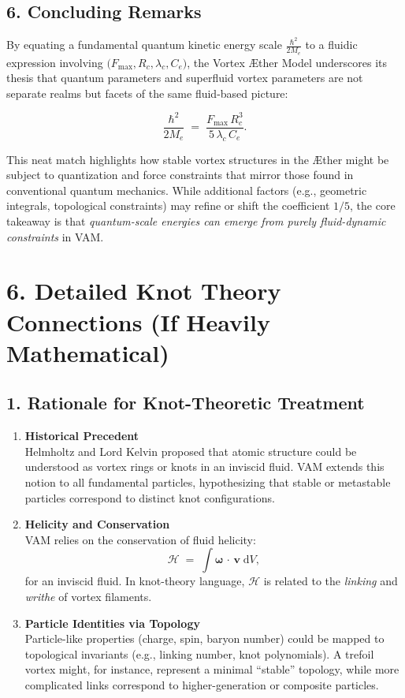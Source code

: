 \documentclass[aps,preprint,superscriptaddress]{revtex4-2}
\begin{document}
    \subsection*{6. Concluding Remarks}

    By equating a fundamental quantum kinetic energy scale \(\tfrac{\hbar^2}{2M_e}\) to a fluidic expression involving \(\bigl(F_{\max}, R_c, \lambda_c, C_e\bigr)\), the Vortex Æther Model underscores its thesis that quantum parameters and superfluid vortex parameters are not separate realms but facets of the same fluid-based picture:

    \[
        \boxed{
            \frac{\hbar^2}{2 M_e}
            \;=\;
            \frac{F_{\text{max}} \, R_c^3}{5 \,\lambda_c\,C_e}.
        }
    \]

    This neat match highlights how stable vortex structures in the Æther might be subject to quantization and force constraints that mirror those found in conventional quantum mechanics. While additional factors (e.g., geometric integrals, topological constraints) may refine or shift the coefficient \(1/5\), the core takeaway is that \textit{quantum-scale energies can emerge from purely fluid-dynamic constraints} in VAM.

    \section*{6. Detailed Knot Theory Connections (If Heavily Mathematical)}

    \subsection*{1. Rationale for Knot-Theoretic Treatment}

    \begin{enumerate}
        \item \textbf{Historical Precedent} \\
    Helmholtz and Lord Kelvin proposed that atomic structure could be understood as vortex rings or knots in an inviscid fluid. VAM extends this notion to all fundamental particles, hypothesizing that stable or metastable particles correspond to distinct knot configurations.
        \item \textbf{Helicity and Conservation} \\
    VAM relies on the conservation of fluid helicity:
    \[
        \mathcal{H}
        \;=\;
        \int
        \boldsymbol{\omega}\,\cdot\,\mathbf{v}\;\mathrm{d}V,
    \]
        for an inviscid fluid. In knot-theory language, \(\mathcal{H}\) is related to the \textit{linking} and \textit{writhe} of vortex filaments.
        \item \textbf{Particle Identities via Topology} \\
    Particle-like properties (charge, spin, baryon number) could be mapped to topological invariants (e.g., linking number, knot polynomials). A trefoil vortex might, for instance, represent a minimal “stable” topology, while more complicated links correspond to higher-generation or composite particles.
    \end{enumerate}
\end{document}
